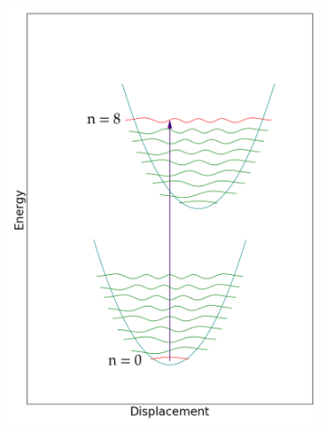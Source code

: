 \documentclass[12pt, fleqn]{beamer}
\begin{document}
\begin{frame}
\begin{overlayarea}{\textwidth}{14cm}
{\begin{figure}[h!]
\begin{subfigure}[b]{0.45\linewidth}
                    \includegraphics[width=\linewidth]{fc/tr_8.png}
                \end{subfigure}
                \begin{subfigure}[b]{0.45\linewidth}

\end{subfigure}
\end{figure}}
\end{overlayarea}
\end{frame}
\end{document}
